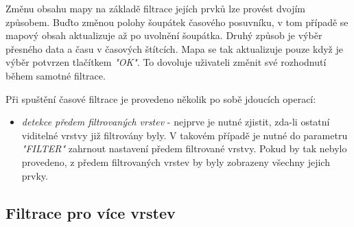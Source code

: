 Změnu obsahu mapy na základě filtrace jejích prvků lze provést dvojím způsobem. Buďto změnou polohy šoupátek časového posuvníku, v tom případě se mapový obsah aktualizuje až po uvolnění šoupátka. Druhý způsob je výběr přesného data a času v časových štítcích. Mapa se tak aktualizuje pouze když je výběr potvrzen tlačítkem \textit{"OK"}. To dovoluje uživateli změnit své rozhodnutí během samotné filtrace. 

Při spuštění časové filtrace je provedeno několik po sobě jdoucích operací:
\begin{itemize}
	\item\textit{detekce předem filtrovaných vrstev} - nejprve je nutné zjistit, zda-li ostatní viditelné vrstvy již filtrovány byly. V takovém případě je nutné do parametru \textit{"FILTER"} zahrnout nastavení předem filtrované vrstvy. Pokud by tak nebylo provedeno, z předem filtrovaných vrstev by byly zobrazeny všechny jejich prvky. 
\end{itemize}




\subsection{Filtrace pro více vrstev}






